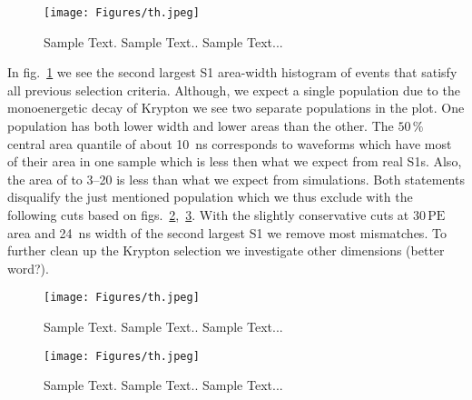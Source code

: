 \begin{figure}
\centering
\texttt{[image: Figures/th.jpeg]}  %
\caption[Area-Width Histogram after Fid. Cut]{
        Sample Text.
        Sample Text..
        Sample Text...
    }
\label{fig:other_s1_area_width}
\end{figure}

In fig.~\ref{fig:other_s1_area_width} we see the second largest S1 area-width histogram of events that satisfy all previous selection criteria.
Although, we expect a single population due to the monoenergetic decay of Krypton we see two separate populations in the plot.
One population has both lower width and lower areas than the other.
The $50\,\%$ central area quantile of about \SI{10}{\nano\s} corresponds to waveforms which have most of their area in one sample which is less then what we expect from real S1s.
Also, the area of to \numrange{3}{20} is less than what we expect from simulations.
Both statements disqualify the just mentioned population which we thus exclude with the following cuts based on figs.~\ref{fig:other_s1_area_cut},~\ref{fig:other_s1_width_cut}.
With the slightly conservative cuts at $30\,\mathrm{PE}$ area and \SI{24}{\nano\s} width of the second largest S1 we remove most mismatches.
To further clean up the Krypton selection we investigate other dimensions (better word?).


\begin{figure}
\centering
\texttt{[image: Figures/th.jpeg]}  %
\caption[Other S1 Area Histogram Cut]{
        Sample Text.
        Sample Text..
        Sample Text...
    }
\label{fig:other_s1_area_cut}
\end{figure}


\begin{figure}
\centering
\texttt{[image: Figures/th.jpeg]}  %
\caption[Other S1 Width Histogram Cut]{
        Sample Text.
        Sample Text..
        Sample Text...
    }
\label{fig:other_s1_width_cut}
\end{figure}




\FloatBarrier





